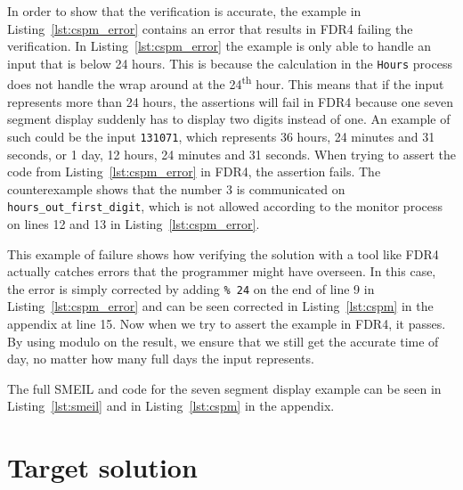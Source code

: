 In order to show that the verification is accurate, the example in Listing~\ref{lst:cspm_error} contains an error that results in FDR4 failing the verification. In Listing~\ref{lst:cspm_error} the example is only able to handle an input that is below 24 hours. This is because the calculation in the \texttt{Hours} process does not handle the wrap around at the 24\textsuperscript{th} hour. This means that if the input represents more than 24 hours, the assertions will fail in FDR4 because one seven segment display suddenly has to display two digits instead of one. An example of such could be the input \texttt{131071}, which represents 36 hours, 24 minutes and 31 seconds, or 1 day, 12 hours, 24 minutes and 31 seconds. When trying to assert the code from Listing~\ref{lst:cspm_error} in FDR4, the assertion fails. The counterexample shows that the number 3 is communicated on \texttt{hours\_out\_first\_digit}, which is not allowed according to the monitor process on lines 12 and 13 in Listing~\ref{lst:cspm_error}.

This example of failure shows how verifying the solution with a tool like FDR4 actually catches errors that the programmer might have overseen. In this case, the error is simply corrected by adding \texttt{\% 24} on the end of line 9 in Listing~\ref{lst:cspm_error} and can be seen corrected in Listing~\ref{lst:cspm} in the appendix at line 15. Now when we try to assert the example in FDR4, it passes. By using modulo on the result, we ensure that we still get the accurate time of day, no matter how many full days the input represents.

The full SMEIL and \cspm{} code for the seven segment display example can be seen in Listing~\ref{lst:smeil} and in Listing~\ref{lst:cspm} in the appendix.

\section{Target solution}

